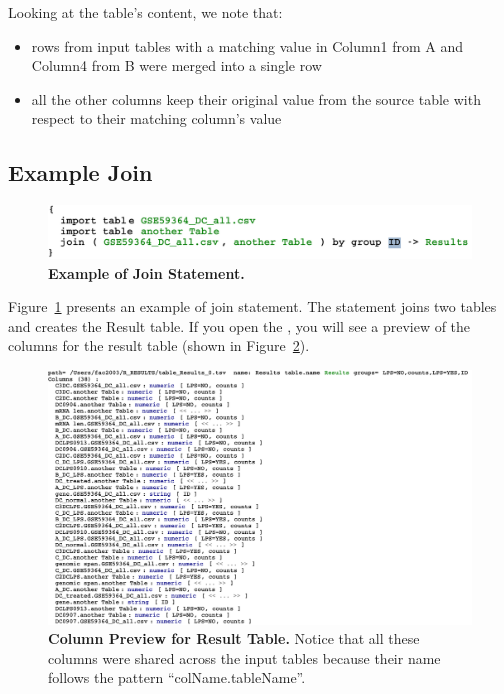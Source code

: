 Looking at the table's content, we note that:
\begin{itemize}
	\item rows from input tables with a matching value in Column1 from A and Column4 from B were merged into a single row
	\item all the other columns keep their original value from the source table with respect to their matching column's value
\end{itemize}


\subsection{Example Join}
\begin{figure}
  \centering
  \includegraphics[width=\figWidthNarrow]{figures/ExampleJoin.pdf}
\caption[Example of Join Statement.]{\textbf{Example of Join Statement.}}
\label{fig:ExampleJoinStatement}
\end{figure}

Figure~\ref{fig:ExampleJoinStatement} presents an example of join statement. The statement joins two tables and creates the Result table. If you open the \inspectorTabIcon{}, you will see a preview of the columns for the result table (shown in Figure~\ref{fig:ColumnPreviewExample}). 

\begin{figure}[h!tbp]
  \centering
  \includegraphics[width=\figWidthNarrow]{figures/ExampleJoinColumnPreview.pdf}
\caption[Column Preview for Result Table.]{\textbf{Column Preview for Result Table.} Notice that all these columns were shared across the input tables because their name follows the pattern ``colName.tableName''.}
\label{fig:ColumnPreviewExample}
\end{figure}


